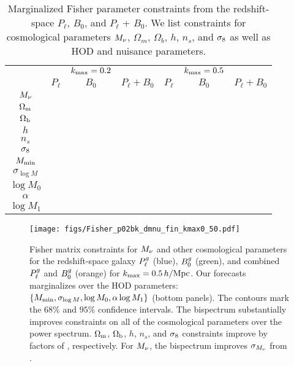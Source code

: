 \begin{table}
    \caption{Marginalized Fisher parameter constraints from the redshift-space 
    $P_\ell$, $B_0$, and $P_\ell$ + $B_0$. We list constraints for cosmological 
    parameters $M_\nu$, $\Omega_m$, $\Omega_b$, $h$, $n_s$, and $\sigma_8$ as well 
    as HOD and nuisance parameters.} 
\begin{center} 
    \begin{tabular}{c|ccc|ccc} \toprule
        & & $k_{\rm max}=0.2$ & & & $k_{\rm max}=0.5$ & \\
        & $P_\ell$ & $B_0$ & $P_\ell + B_0$ & $P_\ell$ & $B_0$ & $P_\ell + B_0$ \\[3pt]
\hline 
$M_\nu$     & & & \\
$\Omega_{\rm m}$       & & & \\
$\Omega_{\rm b}$       & & & \\
$h$         & & & \\
$n_s$       & & & \\
$\sigma_8$      & & & \\[3pt] \hline
$M_{\rm min}$       & & & \\
$\sigma_{\log M}$   & & & \\ 
$\log M_0$          & & & \\
$\alpha$            & & & \\ 
$\log M_1$          & & & \\ [3pt]
\hline            
\end{tabular} \label{tab:forecast}
\end{center}
\end{table}

\begin{figure}
    \begin{center}
        \texttt{[image: figs/Fisher\_p02bk\_dmnu\_fin\_kmax0\_50.pdf]}
        \caption{Fisher matrix constraints for $M_\nu$ and other cosmological
        parameters for the redshift-space galaxy $P^g_{\ell}$ (blue), $B^g_0$
        (green), and combined $P^g_{\ell}$ and $B^g_0$ (orange) for $k_{\rm max} =
        0.5\,h/\mathrm{Mpc}$. Our forecasts marginalizes over the \cite{zheng2007}
        HOD parameters: $\{M_{\rm min}, \sigma_{\log M}, \log M_0, \alpha \log
        M_1 \}$ (bottom panels). The contours mark the $68\%$ and $95\%$
        confidence intervals. The bispectrum substantially improves
        constraints on all of the cosmological parameters over the power
        spectrum. $\Omega_{\rm m}$, $\Omega_{\rm b}$, $h$, $n_s$, and $\sigma_8$ constraints improve by factors
        of , respectively. For $M_\nu$, the
        bispectrum improves $\sigma_{M_\nu}$ from .
        }
        \label{fig:forecast}
    \end{center}
\end{figure}

